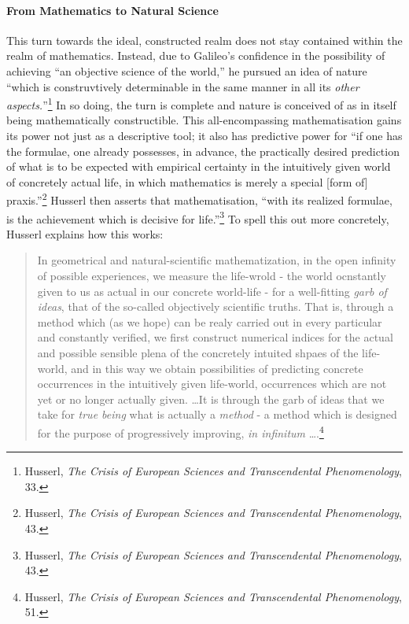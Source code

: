 \documentclass[12pt]{article}
\begin{document}
	\paragraph*{From Mathematics to Natural Science} This turn towards the ideal, constructed realm does not stay contained within the realm of mathematics. Instead, due to Galileo's confidence in the possibility of achieving ``an objective science of the world,'' he pursued an idea of nature ``which is construvtively determinable in the same manner in all its \emph{other aspects.}''\footnote{Husserl, \emph{The Crisis of European Sciences and Transcendental Phenomenology}, 33.} In so doing, the turn is complete and nature is conceived of as in itself being mathematically constructible. This all-encompassing mathematisation gains its power not just as a descriptive tool; it also has predictive power for ``if one has the formulae, one already possesses, in advance, the practically desired prediction of what is to be expected with empirical certainty in the intuitively given world of concretely actual life, in which mathematics is merely a special [form of] praxis.''\footnote{Husserl, \emph{The Crisis of European Sciences and Transcendental Phenomenology}, 43.} Husserl then asserts that mathematisation, ``with its realized formulae, is the achievement which is decisive for life.''\footnote{Husserl, \emph{The Crisis of European Sciences and Transcendental Phenomenology}, 43.} To spell this out more concretely, Husserl explains how this works:
	
	\begin{quote}
	\singlespacing
	\footnotesize
	
	In geometrical and natural-scientific mathematization, in the open infinity of possible experiences, we measure the life-wrold - the world ocnstantly given to us as actual in our concrete world-life - for a well-fitting \emph{garb of ideas}, that of the so-called objectively scientific truths. That is, through a method which (as we hope) can be realy carried out in every particular and constantly verified, we first construct numerical indices for the actual and possible sensible plena of the concretely intuited shpaes of the life-world, and in this way we obtain possibilities of predicting concrete occurrences in the intuitively given life-world, occurrences which are not yet or no longer actually given. \ldots It is through the garb of ideas that we take for \emph{true being} what is actually a \emph{method} - a method which is designed for the purpose of progressively improving, \emph{in infinitum} \ldots.\footnote{Husserl, \emph{The Crisis of European Sciences and Transcendental Phenomenology}, 51.}
	
	\end{quote}
	
\end{document}
